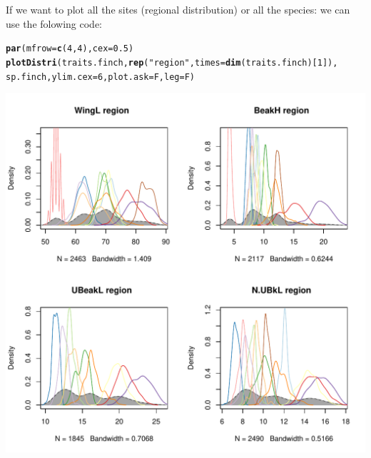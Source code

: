 \documentclass[12pt]{article}\usepackage[]{graphicx}\usepackage[]{color}
\makeatletter
\def\maxwidth{ %
  \ifdim\Gin@nat@width>\linewidth
    \linewidth
  \else
    \Gin@nat@width
  \fi
}
\newcommand{\hlnum}[1]{\textcolor[rgb]{0.686,0.059,0.569}{#1}}%
\newcommand{\hlstr}[1]{\textcolor[rgb]{0.192,0.494,0.8}{#1}}%
\newcommand{\hlstd}[1]{\textcolor[rgb]{0.345,0.345,0.345}{#1}}%
\newcommand{\hlkwc}[1]{\textcolor[rgb]{0.333,0.667,0.333}{#1}}%
\newcommand{\hlkwd}[1]{\textcolor[rgb]{0.737,0.353,0.396}{\textbf{#1}}}%
\newenvironment{kframe}{%
 \def\at@end@of@kframe{}%
 \ifinner\ifhmode%
  \def\at@end@of@kframe{\end{minipage}}%
  \begin{minipage}{\columnwidth}%
 \fi\fi%
 \def\FrameCommand##1{\hskip\@totalleftmargin \hskip-\fboxsep
 \colorbox{shadecolor}{##1}\hskip-\fboxsep
     \hskip-\linewidth \hskip-\@totalleftmargin \hskip\columnwidth}%
 \MakeFramed {\advance\hsize-\width
   \@totalleftmargin\z@ \linewidth\hsize
   \@setminipage}}%
 {\par\unskip\endMakeFramed%
 \at@end@of@kframe}
\newenvironment{knitrout}{}{} %
\makeatother
\begin{document}
If we want to plot all the sites (regional distribution) or all the species: we can use the folowing code:
\begin{knitrout}
\color{fgcolor}\begin{kframe}
\begin{alltt}
\hlkwd{par}\hlstd{(}\hlkwc{mfrow}\hlstd{=}\hlkwd{c}\hlstd{(}\hlnum{4}\hlstd{,}\hlnum{4}\hlstd{),} \hlkwc{cex}\hlstd{=}\hlnum{0.5}\hlstd{)}
\hlkwd{plotDistri}\hlstd{(traits.finch,} \hlkwd{rep}\hlstd{(}\hlstr{"region"}\hlstd{,} \hlkwc{times}\hlstd{=}\hlkwd{dim}\hlstd{(traits.finch)[}\hlnum{1}\hlstd{]),}
          \hlstd{sp.finch,} \hlkwc{ylim.cex}\hlstd{=}\hlnum{6}\hlstd{,} \hlkwc{plot.ask}\hlstd{=F,} \hlkwc{leg}\hlstd{=F)}
\end{alltt}
\end{kframe}
\includegraphics[width=\maxwidth]{figure/unnamed-chunk-13} 

\end{knitrout}
\end{document}
